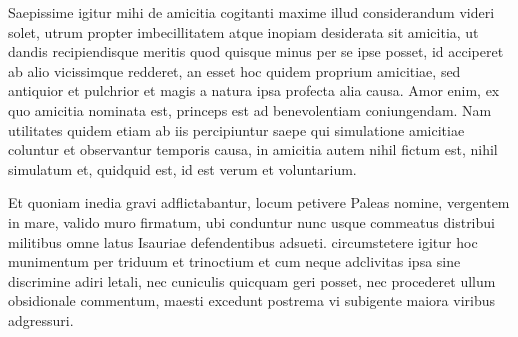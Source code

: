 Saepissime igitur mihi de amicitia cogitanti maxime illud considerandum videri
solet, utrum propter imbecillitatem atque inopiam desiderata sit amicitia, ut
dandis recipiendisque meritis quod quisque minus per se ipse posset, id
acciperet ab alio vicissimque redderet, an esset hoc quidem proprium amicitiae,
          sed antiquior et pulchrior et magis a natura ipsa profecta alia
          causa. Amor enim, ex quo amicitia nominata est, princeps est ad
          benevolentiam coniungendam. Nam utilitates quidem etiam ab iis
          percipiuntur saepe qui simulatione amicitiae coluntur et observantur
          temporis causa, in amicitia autem nihil fictum est, nihil simulatum
          et, quidquid est, id est verum et voluntarium.

Et quoniam inedia gravi adflictabantur, locum petivere Paleas nomine, vergentem
in mare, valido muro firmatum, ubi conduntur nunc usque commeatus distribui
militibus omne latus Isauriae defendentibus adsueti. circumstetere igitur hoc
munimentum per triduum et trinoctium et cum neque adclivitas ipsa sine
discrimine adiri letali, nec cuniculis quicquam geri posset, nec procederet
ullum obsidionale commentum, maesti excedunt postrema vi subigente maiora
viribus adgressuri.
